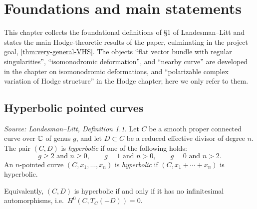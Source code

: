 \chapter{Foundations and main statements}
\label{chap:foundations}


This chapter collects the foundational definitions of \S1 of Landesman--Litt and
states the main Hodge-theoretic results of the paper, culminating in the project
goal, \cref{thm:very-general-VHS}. The objects ``flat vector bundle with regular
singularities'', ``isomonodromic deformation'', and ``nearby curve'' are
developed in the chapter on isomonodromic deformations, and ``polarizable complex
variation of Hodge structure'' in the Hodge chapter; here we only refer to them.

\section{Hyperbolic pointed curves}

\begin{definition}
  \label{def:hyperbolic}
  \textit{Source: Landesman--Litt, Definition 1.1.}
  Let $C$ be a smooth proper connected curve over $\mathbb{C}$ of genus $g$, and let
  $D \subset C$ be a reduced effective divisor of degree $n$. The pair $(C, D)$
  is \emph{hyperbolic} if one of the following holds:
  \[
    g \ge 2 \text{ and } n \ge 0, \qquad
    g = 1 \text{ and } n > 0, \qquad
    g = 0 \text{ and } n > 2.
  \]
  An $n$-pointed curve $(C, x_1, \ldots, x_n)$ is \emph{hyperbolic} if
  $(C, x_1 + \cdots + x_n)$ is hyperbolic.

  Equivalently, $(C, D)$ is hyperbolic if and only if it has no infinitesimal
  automorphisms, i.e.\ $H^0(C, T_C(-D)) = 0$.
\end{definition}

